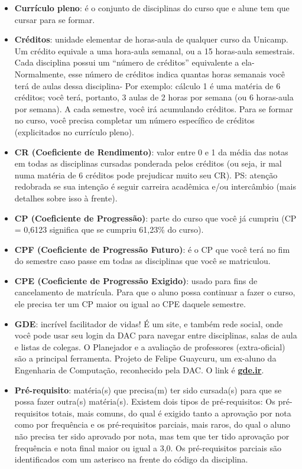 \begin{itemize}
    \item \textbf{Currículo pleno}: é o conjunto de disciplinas do curso que e alune tem que cursar para se formar.
    \item \textbf{Créditos}: unidade elementar de horas-aula de qualquer curso da Unicamp. Um crédito equivale a uma hora-aula semanal, ou a 15 horas-aula semestrais. Cada disciplina possui um “número de créditos” equivalente a ela- Normalmente, esse número de créditos indica quantas horas semanais você terá de aulas dessa disciplina- Por exemplo: cálculo 1 é uma matéria de 6 créditos; você terá, portanto, 3 aulas de 2 horas por semana (ou 6 horas-aula por semana). A cada semestre, você irá acumulando créditos. Para se formar no curso, você precisa completar um número específico de créditos (explicitados no currículo pleno).
    \item \textbf{CR (Coeficiente de Rendimento)}: valor entre 0 e 1 da média das notas em todas as disciplinas cursadas ponderada pelos créditos (ou seja, ir mal numa matéria de 6 créditos pode prejudicar muito seu CR). PS: atenção redobrada se sua intenção é seguir carreira acadêmica e/ou intercâmbio (mais detalhes sobre isso à frente).
    \item \textbf{CP (Coeficiente de Progressão)}: parte do curso que você já cumpriu (CP = 0,6123 significa que se cumpriu 61,23\% do curso).
    \item \textbf{CPF (Coeficiente de Progressão Futuro)}: é o CP que você terá no fim do semestre caso passe em todas as disciplinas que você se matriculou.
    \item \textbf{CPE (Coeficiente de Progressão Exigido)}: usado para fins de cancelamento de matrícula. Para que o aluno possa continuar a fazer o curso, ele precisa ter um CP maior ou igual ao CPE daquele semestre.
    \item \textbf{GDE}: incrível facilitador de vidas! É um site, e também rede social, onde você pode usar seu login da DAC para navegar entre disciplinas, salas de aula e listas de colegas. O Planejador e a avaliação de professores (extra-oficial) são a principal ferramenta. Projeto de Felipe Guaycuru, um ex-aluno da Engenharia de Computação, reconhecido pela DAC. O link é \textbf{\url{gde.ir}}.
    \item \textbf{Pré-requisito}: matéria(s) que precisa(m) ter sido cursada(s) para que se possa fazer outra(s) matéria(s). Existem dois tipos de pré-requisitos: Os pré-requisitos totais, mais comuns, do qual é exigido tanto a aprovação por nota como por frequência e os pré-requisitos parciais, mais raros, do qual o aluno não precisa ter sido aprovado por nota, mas tem que ter tido aprovação por frequência e nota final maior ou igual a 3,0. Os pré-requisitos parciais são identificados com um asterisco na frente do código da disciplina.

\end{itemize}

